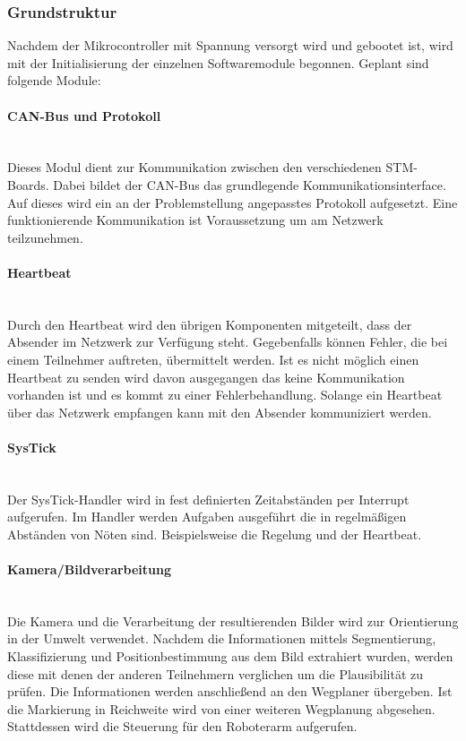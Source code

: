 \subsubsection{Grundstruktur}
Nachdem der Mikrocontroller mit Spannung versorgt wird und gebootet ist, wird mit der Initialisierung der einzelnen Softwaremodule begonnen. Geplant sind folgende Module: 
\paragraph{CAN-Bus und  Protokoll}$\;$\\
Dieses Modul dient zur Kommunikation zwischen den verschiedenen STM-Boards. Dabei bildet der CAN-Bus das grundlegende Kommunikationsinterface. Auf dieses wird ein an der Problemstellung angepasstes Protokoll aufgesetzt. Eine funktionierende Kommunikation ist Voraussetzung um am Netzwerk teilzunehmen.

\paragraph{Heartbeat}$\;$\\
Durch den Heartbeat wird den übrigen Komponenten mitgeteilt, dass der Absender im Netzwerk zur Verfügung steht. Gegebenfalls können Fehler, die bei einem Teilnehmer auftreten, übermittelt werden. Ist es nicht möglich einen Heartbeat zu senden wird davon ausgegangen das keine Kommunikation vorhanden ist und es kommt zu einer  Fehlerbehandlung. Solange ein Heartbeat über das Netzwerk empfangen kann mit den Absender kommuniziert werden.

\paragraph{SysTick}$\;$\\
Der SysTick-Handler wird in fest definierten Zeitabständen per Interrupt aufgerufen. Im Handler werden Aufgaben ausgeführt die in regelmäßigen Abständen von Nöten sind. Beispielsweise die Regelung und der Heartbeat.

\paragraph{Kamera/Bildverarbeitung}$\;$\\
Die Kamera und die Verarbeitung der resultierenden Bilder wird zur Orientierung in der Umwelt verwendet. Nachdem die Informationen mittels Segmentierung, Klassifizierung und Positionbestimmung aus dem Bild extrahiert wurden, werden diese mit denen der anderen Teilnehmern verglichen um die Plausibilität zu prüfen. Die Informationen werden anschließend an den Wegplaner übergeben. Ist die Markierung in Reichweite wird von einer weiteren Wegplanung abgesehen. Stattdessen wird die Steuerung für den Roboterarm aufgerufen.

